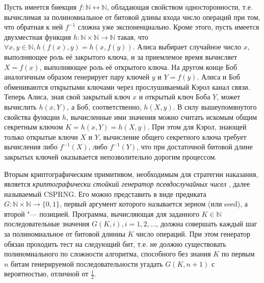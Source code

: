 Пусть имеется биекция $f: \mathbb{N} \leftrightarrow \mathbb{N}$, обладающая свойством односторонности, т.е. вычислимая за полиномиальное от битовой длины входа число операций при том, что обратная к ней $f^{-1}$ сложна уже экспоненциально. Кроме этого, пусть имеется двухместная функция $h : \mathbb{N} \times \mathbb{N} \rightarrow \mathbb{N}$ такая, что $\forall x, y \in \mathbb{N}, h(f(x), y) = h(x, f(y))$. Алиса выбирает случайное число $x$, выполняющее роль её закрытого ключа, и за приемлемое время вычисляет $X = f(x)$, выполняющее роль её открытого ключа. На другом конце Боб аналогичным образом генерирует пару ключей $y$ и $Y = f(y)$. Алиса и Боб обмениваются открытыми ключами через прослушиваемый Кэрол канал связи. Теперь Алиса, зная свой закрытый ключ $x$ и открытый ключ Боба $Y$, может вычислить $h(x, Y)$, а Боб, соответственно, $h(X, y)$. В силу вышеупомянутого свойства функции $h$, вычисленные ими значения можно считать искомым общим секретным ключом $K = h(x, Y) = h(X, y)$. При этом для Кэрол, знающей только открытые ключи $X$ и $Y$, вычисление общего секретного ключа требует вычисления либо $f^{-1}(X)$, либо $f^{-1}(Y)$, что при достаточной битовой длине закрытых ключей оказывается непозволительно дорогим процессом.

Вторым криптографическим примитивом, необходимым для стратегии наказания, является \emph{криптографически стойкий генератор псевдослучайных чисел} \cite{Gutmann}, далее называемый CSPRNG. Его можно представить в виде предиката $G : \mathbb{N} \times \mathbb{N} \rightarrow \{0, 1\}$, первый аргумент которого называется зерном (или seed), а второй "--- позицией. Программа, вычисляющая для заданного $K \in \mathbb{N}$ последовательные значения $G(K, i), i = 1, 2, \ldots$, должна совершать каждый шаг за полиномиальное от битовой длинны $K$ число операций. При этом генератор обязан проходить тест на следующий бит, т.е. не должно существовать полиномиального по сложности алгоритма, способного без знания $K$ по первым $n$ битам генерируемой последовательности угадать $G(K, n+1)$ с вероятностью, отличной от $\frac{1}{2}$.

